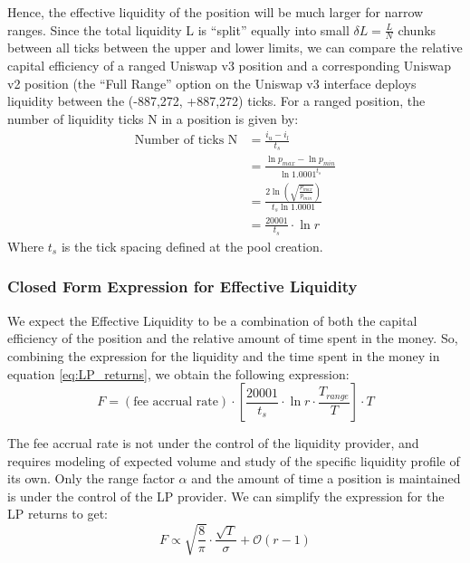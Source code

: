 \documentclass{article}
\begin{document}
Hence, the effective liquidity of the position will be much larger for narrow ranges. Since the total liquidity L is “split” equally into small 
$\delta L = \frac{L}{N}$ chunks between all ticks between the upper and lower limits, we can compare the relative capital efficiency of a ranged Uniswap v3 position and a corresponding Uniswap v2 position (the “Full Range” option on the Uniswap v3 interface deploys liquidity between the (-887,272, +887,272) ticks. For a ranged position, the number of liquidity ticks N in a position is given by:
\begin{equation}
    \begin{split}
            \text{Number of ticks N} & = \frac{i_u - i_l}{t_s} \\
            & = \frac{\ln{p_{max}} -\ln{p_{min}}}{\ln{1.0001}^{t_s}} \\
            & = \frac{2 \ln{(\sqrt{\frac{p_{max}}{p_{min}}})}}{t_s \ln{1.0001}}\\
            & = \frac{20001}{t_s}\cdot \ln{r}
    \end{split}
\end{equation}
Where $t_s$ is the tick spacing defined at the pool creation.
\subsubsection{Closed Form Expression for Effective Liquidity}
We expect the Effective Liquidity to be a combination of both the capital efficiency of the position and the relative amount of time spent in the money. So, combining the expression for the liquidity and the time spent in the money in equation \eqref{eq:LP_returns}, we obtain the following expression:
\begin{equation}
    F=(\text{fee accrual rate})\cdot \left[ \frac{20001}{t_s}\cdot \ln{r}\cdot \frac{T_{range}}{T}\right]\cdot T
\end{equation}

The fee accrual rate is not under the control of the liquidity provider, and requires modeling of expected volume and study of the specific liquidity profile of its own. Only the range factor $\alpha$ and the amount of time a position is maintained is under the control of the LP provider.
We can simplify the expression for the LP returns to get:
\begin{equation}
    F \propto \sqrt{\frac{8}{\pi}}\cdot \frac{\sqrt{T}}{\sigma} + \mathcal{O}(r-1)
\end{equation}
\end{document}
